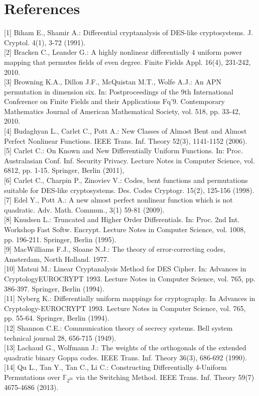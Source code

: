 \documentclass[10pt]{article}
\begin{document}
\section*{References}
[1] Biham E., Shamir A.: Differential cryptanalysis of DES-like cryptosystems. J. Cryptol. 4(1), 3-72 (1991).\\[0pt]
[2] Bracken C., Leander G.: A highly nonlinear differentially 4 uniform power mapping that permutes fields of even degree. Finite Fields Appl. 16(4), 231-242, 2010.\\[0pt]
[3] Browning K.A., Dillon J.F., McQuistan M.T., Wolfe A.J.: An APN permutation in dimension six. In: Postproceedings of the 9th International Conference on Finite Fields and their Applications Fq'9. Contemporary Mathematics Journal of American Mathematical Society, vol. 518, pp. 33-42, 2010.\\[0pt]
[4] Budaghyan L., Carlet C., Pott A.: New Classes of Almost Bent and Almost Perfect Nonlinear Functions. IEEE Trans. Inf. Theory 52(3), 1141-1152 (2006).\\[0pt]
[5] Carlet C.: On Known and New Differentially Uniform Functions. In: Proc. Australasian Conf. Inf. Security Privacy. Lecture Notes in Computer Science, vol. 6812, pp. 1-15. Springer, Berlin (2011),\\[0pt]
[6] Carlet C., Charpin P., Zinoviev V.: Codes, bent functions and permutations suitable for DES-like cryptosystems. Des. Codes Cryptogr. 15(2), 125-156 (1998).\\[0pt]
[7] Edel Y., Pott A.: A new almost perfect nonlinear function which is not quadratic. Adv. Math. Commun., 3(1) 59-81 (2009).\\[0pt]
[8] Knudsen L.: Truncated and Higher Order Differentials. In: Proc. 2nd Int. Workshop Fast Softw. Encrypt. Lecture Notes in Computer Science, vol. 1008, pp. 196-211. Springer, Berlin (1995).\\[0pt]
[9] MacWilliams F.J., Sloane N.J.: The theory of error-correcting codes, Amsterdam, North Holland. 1977.\\[0pt]
[10] Matsui M.: Linear Cryptanalysis Method for DES Cipher. In: Advances in CryptologyEUROCRYPT 1993. Lecture Notes in Computer Science, vol. 765, pp. 386-397. Springer, Berlin (1994).\\[0pt]
[11] Nyberg K.: Differentially uniform mappings for cryptography. In Advances in Cryptology-EUROCRYPT 1993. Lecture Notes in Computer Science, vol. 765, pp. 55-64. Springer, Berlin (1994).\\[0pt]
[12] Shannon C.E.: Communication theory of secrecy systems. Bell system technical journal 28, 656-715 (1949).\\[0pt]
[13] Lachaud G., Wolfmann J.: The weights of the orthogonals of the extended quadratic binary Goppa codes. IEEE Trans. Inf. Theory 36(3), 686-692 (1990).\\[0pt]
[14] Qu L., Tan Y., Tan C., Li C.: Constructing Differentially 4-Uniform Permutations over $\mathbb{F}_{2^{2 k}}$ via the Switching Method. IEEE Trans. Inf. Theory 59(7) 4675-4686 (2013).
\end{document}
